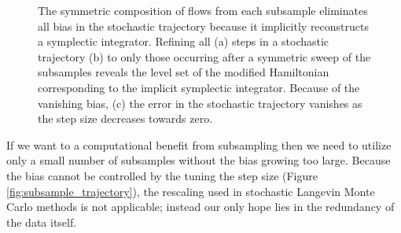 \documentclass{article}
\begin{document}
\begin{figure}
\centering
{}
\caption{The symmetric composition of flows from each subsample eliminates
all bias in the stochastic trajectory because it implicitly reconstructs a symplectic
integrator.  Refining all (a) steps in a stochastic trajectory (b) to
only those occurring after a symmetric sweep of the subsamples reveals
the level set of the modified Hamiltonian corresponding to the implicit
symplectic integrator.  Because of the vanishing bias, (c) the error in the
stochastic trajectory vanishes as the step size decreases towards zero. }
\label{fig:symmetric_stochastic}
\end{figure}

If we want to a computational benefit from subsampling then we need to
utilize only a small number of subsamples without the bias growing too
large.  Because the bias cannot be controlled by the tuning the step size
(Figure \ref{fig:subsample_trajectory}), the rescaling used in stochastic
Langevin Monte Carlo methods 
\cite{WellingEtAl:2011, TehEtAl:2014, VollmerEtAl:2015} is not applicable; 
instead our only hope lies in the redundancy of the data itself.  
\end{document}
